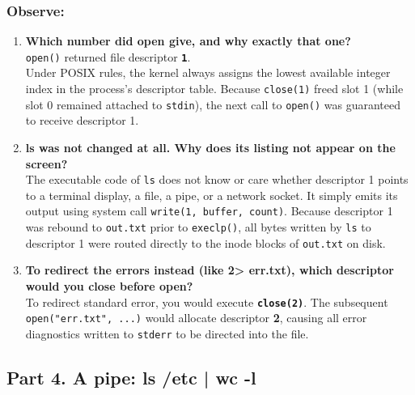 \documentclass{labreport}
\begin{document}
\subsubsection*{Observe:}
\begin{enumerate}[leftmargin=*]
    \item \textbf{Which number did open give, and why exactly that one?}\\[0.2em]
    \texttt{open()} returned file descriptor \textbf{\texttt{1}}.\\
    Under POSIX rules, the kernel always assigns the lowest available integer index in the process's descriptor table. Because \texttt{close(1)} freed slot 1 (while slot 0 remained attached to \texttt{stdin}), the next call to \texttt{open()} was guaranteed to receive descriptor 1.

    \item \textbf{ls was not changed at all. Why does its listing not appear on the screen?}\\[0.2em]
    The executable code of \texttt{ls} does not know or care whether descriptor 1 points to a terminal display, a file, a pipe, or a network socket. It simply emits its output using system call \texttt{write(1, buffer, count)}. Because descriptor 1 was rebound to \texttt{out.txt} prior to \texttt{execlp()}, all bytes written by \texttt{ls} to descriptor 1 were routed directly to the inode blocks of \texttt{out.txt} on disk.

    \item \textbf{To redirect the errors instead (like 2> err.txt), which descriptor would you close before open?}\\[0.2em]
    To redirect standard error, you would execute \textbf{\texttt{close(2)}}. The subsequent \texttt{open("err.txt", ...)} would allocate descriptor \textbf{2}, causing all error diagnostics written to \texttt{stderr} to be directed into the file.
\end{enumerate}

\subsection{Part 4. A pipe: ls /etc | wc -l}
\end{document}
